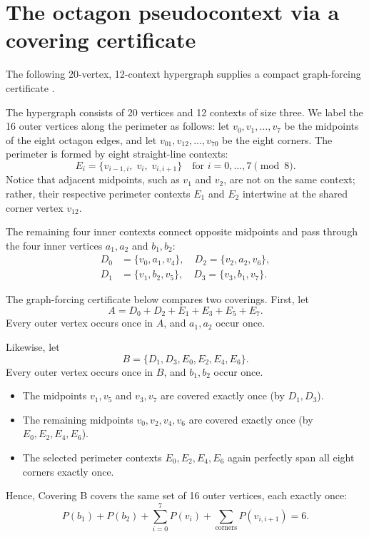 \documentclass[
  twocolumn,
  aps,
  pra,
  floatfix,
  amsmath,amssymb,
  longbibliography
]{revtex4-2}
\theoremstyle{definition}
\theoremstyle{remark}
\begin{document}
\section{The octagon pseudocontext via a covering certificate}
\label{s:octagon}

The following 20-vertex, 12-context hypergraph supplies a compact
graph-forcing certificate \cite{NSvozil:QS24}.

The hypergraph consists of 20 vertices and 12 contexts of size three. We label the 16 outer vertices along the perimeter as follows: let $v_0, v_1, \ldots, v_7$ be the midpoints of the eight octagon edges, and let $v_{01}, v_{12}, \ldots, v_{70}$ be the eight corners. The perimeter is formed by eight straight-line contexts:
\begin{equation*}
    E_i = \{v_{i-1, i},\; v_i,\; v_{i, i+1}\} \quad \text{for } i=0,\dots,7 \pmod 8.
\end{equation*}
Notice that adjacent midpoints, such as $v_1$ and $v_2$, are not on the same context; rather, their respective perimeter contexts $E_1$ and $E_2$ intertwine at the shared corner vertex $v_{12}$.

The remaining four inner contexts connect opposite midpoints and pass through the four inner vertices $a_1, a_2$ and $b_1, b_2$:
\begin{align*}
    D_0 &= \{v_0, a_1, v_4\}, \quad D_2 = \{v_2, a_2, v_6\}, \\
    D_1 &= \{v_1, b_2, v_5\}, \quad D_3 = \{v_3, b_1, v_7\}.
\end{align*}

The graph-forcing certificate below compares two coverings.  First, let
\[
 A=D_0+D_2+E_1+E_3+E_5+E_7.
\]
Every outer vertex occurs once in $A$, and $a_1,a_2$ occur once.

Likewise, let
\begin{equation*}
    B = \{D_1, D_3, E_0, E_2, E_4, E_6\}.
\end{equation*}
Every outer vertex occurs once in $B$, and $b_1,b_2$ occur once.
\iffalse
\begin{itemize}
    \item The midpoints $v_1, v_5$ and $v_3, v_7$ are covered exactly once (by $D_1, D_3$).
    \item The remaining midpoints $v_0, v_2, v_4, v_6$ are covered exactly once (by $E_0, E_2, E_4, E_6$).
    \item The selected perimeter contexts $E_0, E_2, E_4, E_6$ again perfectly span all eight corners exactly once.
\end{itemize}
Hence, Covering B covers the same set of 16 outer vertices, each exactly once:
\begin{equation}
    P(b_1) + P(b_2) + \sum_{i=0}^7 P(v_i) + \sum_{\text{corners}} P(v_{i, i+1}) = 6. \label{eq:covB}
\end{equation}
\end{document}
